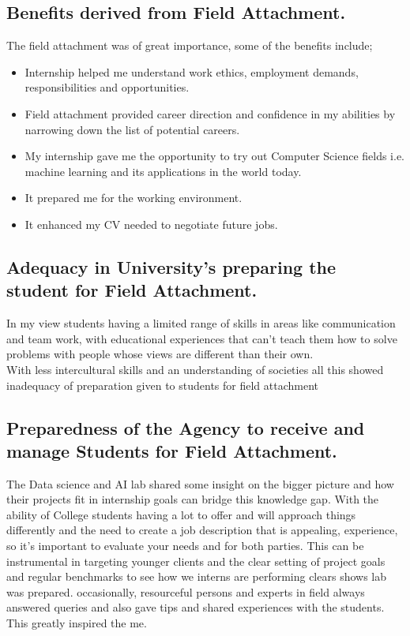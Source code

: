 \documentclass[11pt]{article}
\begin{document}
\subsection{Benefits derived from Field Attachment.}
The field attachment was of great importance, some of the benefits include;\\
\begin{itemize}
	\item Internship helped me understand work ethics, employment demands, responsibilities and
	opportunities.\\
	\item Field attachment provided career direction and confidence in my abilities by narrowing
	down the list of potential careers.\\
	\item My internship gave me the opportunity to try out Computer Science fields  i.e.
	machine learning and its applications in the world today.\\
	\item It prepared me for the working environment.\\
	\item It enhanced my CV needed to negotiate future jobs.\\
	
\end{itemize}

\subsection{Adequacy in University’s preparing the student for Field Attachment.}
In my view students having a limited range of skills in areas like communication and team work,
with educational experiences that can’t teach them how to solve problems with people whose
views are different than their own.\\

With less intercultural skills and an understanding of societies all this showed inadequacy of
preparation given to students for field attachment\\
\subsection{Preparedness of the Agency to receive and manage Students for Field Attachment.}
The Data science and AI lab shared some insight on the bigger picture and how their projects fit in internship goals
can bridge this knowledge gap. With the ability of College students having a lot to offer and will
approach things differently and the need to create a job description that is appealing, experience,
so it’s important to evaluate your needs and for both parties. This can be instrumental in targeting
younger clients and the clear setting of project goals and regular benchmarks to see how we interns
are performing clears shows lab was prepared. occasionally, resourceful persons and experts
in field always answered queries and also gave tips and shared experiences with the students. This
greatly inspired the me.
\end{document}
